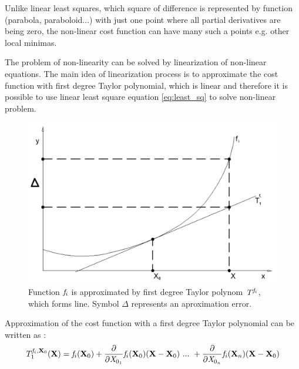 \documentclass[a4paper,12pt]{article}
\newcommand{\evect}[1]{
{\bf #1}
}
\newcommand{\escal}[1]{
{\it #1}
}
\newcommand{\efunc}[1]{
{\it #1}
}
\begin{document}
Unlike linear least squares, which square of difference \label{eq:least_be_part}
is represented by function  (parabola, paraboloid...) with just one point where all
partial derivatives are being zero, the non-linear cost function can have many such a points e.g. other local minimas. 

The problem of non-linearity can be solved by linearization of non-linear equations.
The main idea of linearization process is to approximate the cost function with first degree Taylor polynomial,
which is linear and therefore it is possible to use linear least square equation \eqref{eq:least_sq} 
to solve non-linear problem. 

\begin{figure}[h]
    \centering
    \includegraphics[scale=0.2]{figures/taylor.png}
    \caption{Function $\efunc{f}_{i}$ is approximated by first degree Taylor polynom $\efunc{T} ^{\efunc{f}_{i}}$,
    which forms line. Symbol $\Delta$ represents an aproximation error.}
    \label{fig:taylor}
\end{figure}


Approximation of the cost function with a first degree Taylor polynomial can be written as \cite{cadaprednaskove}:
\begin{equation}
\efunc{T} ^{\efunc{f}_{i}, \evect{X}_{0}}_{1} (\evect{X}) = 
	      \efunc{f}_{i}(\evect{X}_{0}) + 
               \frac{\partial}{\partial {\escal{X}_{0_{1}}}} \efunc{f}_{i} (\evect{X}_{0}) (\evect{X} -  \evect{X}_{0}) 
\ ... \ + \frac{\partial}{\partial {\escal{X}_{0_{n}}}} \efunc{f_{i}}(\evect{X}_{n}) (\evect{X} - \evect{X}_{0}) 
\end{equation}

\end{document}
